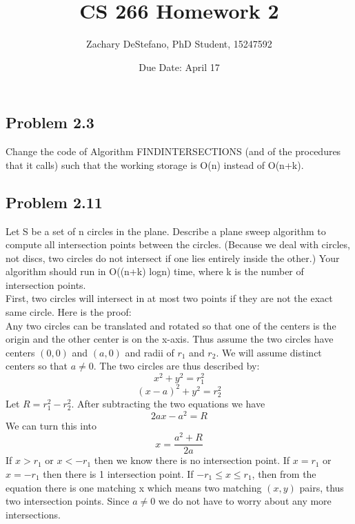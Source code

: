 \documentclass[11pt,psfig]{article}
\begin{document}
\setlength{\parskip}{1.2ex plus0.3ex minus 0.3ex}


\thispagestyle{empty} \pagestyle{myheadings} 



\title{CS 266 Homework 2}
\author{Zachary DeStefano, PhD Student, 15247592}
\date{Due Date: April 17}

\maketitle

\vfill\eject

\subsection*{Problem 2.3}

Change the code of Algorithm FINDINTERSECTIONS (and of the procedures
that it calls) such that the working storage is O(n) instead of
O(n+k).


\subsection*{Problem 2.11}

Let S be a set of n circles in the plane. Describe a plane sweep algorithm to compute all intersection points between the circles. (Because we deal with circles, not discs, two circles do not intersect if one lies entirely
inside the other.) Your algorithm should run in O((n+k) logn) time,
where k is the number of intersection points.
\\
First, two circles will intersect in at most two points if they are not the exact same circle. Here is the proof:
\\
Any two circles can be translated and rotated so that one of the centers is the origin and the other center is on the x-axis. Thus assume the two circles have centers $(0,0)$ and $(a,0)$ and radii of $r_1$ and $r_2$. We will assume distinct centers so that $a \neq 0$. The two circles are thus described by:\\
\[
x^2 + y^2 = r_1^2
\]
\[
(x-a)^2 + y^2 = r_2^2
\]
Let $R=r_1^2-r_2^2$. After subtracting the two equations we have
\[
2ax - a^2 = R
\]
We can turn this into
\[
x = \frac{a^2 + R}{2a}
\]
If $x>r_1$ or $x < -r_1$ then we know there is no intersection point. If $x=r_1$ or $x=-r_1$ then there is 1 intersection point. If $-r_1 \leq x \leq r_1$, then from the equation there is one matching x which means two matching $(x,y)$ pairs, thus two intersection points. Since $a \neq 0$ we do not have to worry about any more intersections. 
\end{document}

